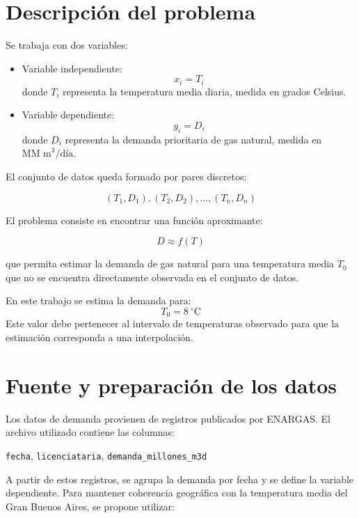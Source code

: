 \documentclass[12pt,a4paper]{article}
\newcommand{\unidadDemanda}{\text{MM m}^3/\text{día}}
\newcommand{\unidadTemp}{^\circ\text{C}}
\begin{document}
\section{Descripción del problema}

Se trabaja con dos variables:

\begin{itemize}
    \item Variable independiente:
    \[
        x_i = T_i
    \]
    donde \(T_i\) representa la temperatura media diaria, medida en grados Celsius.

    \item Variable dependiente:
    \[
        y_i = D_i
    \]
    donde \(D_i\) representa la demanda prioritaria de gas natural, medida en \(\unidadDemanda\).
\end{itemize}

El conjunto de datos queda formado por pares discretos:

\[
(T_1,D_1), (T_2,D_2), \dots, (T_n,D_n)
\]

El problema consiste en encontrar una función aproximante:

\[
D \approx f(T)
\]

que permita estimar la demanda de gas natural para una temperatura media \(T_0\) que no se encuentra directamente observada en el conjunto de datos.

\begin{importantbox}
En este trabajo se estima la demanda para:
\[
    T_0 = \boxed{8} \ \unidadTemp
\]
Este valor debe pertenecer al intervalo de temperaturas observado para que la estimación corresponda a una interpolación.
\end{importantbox}

\section{Fuente y preparación de los datos}

Los datos de demanda provienen de registros publicados por ENARGAS. El archivo utilizado contiene las columnas:

\begin{center}
\texttt{fecha}, \texttt{licenciataria}, \texttt{demanda\_millones\_m3d}
\end{center}

A partir de estos registros, se agrupa la demanda por fecha y se define la variable dependiente. Para mantener coherencia geográfica con la temperatura media del Gran Buenos Aires, se propone utilizar:
\end{document}
